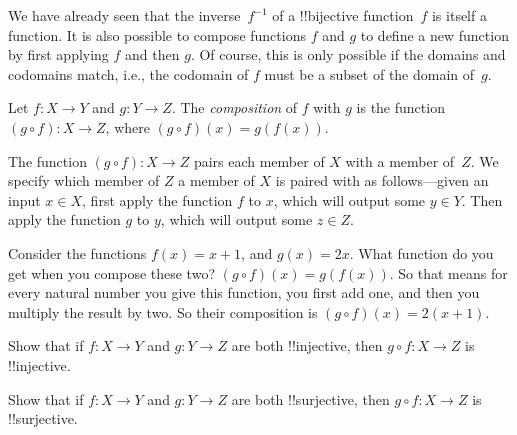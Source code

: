 \documentclass[../../../include/open-logic-section]{subfiles}
\begin{document}

\begin{explain}
We have already seen that the inverse~$f^{-1}$ of a !!{bijective}
function~$f$ is itself a function. It is also possible to compose
functions $f$ and $g$ to define a new function by first applying $f$
and then $g$. Of course, this is only possible if the domains and
codomains match, i.e., the codomain of $f$ must be a subset of the
domain of~$g$.
\end{explain}

\begin{defn}[Composition]
Let $f\colon X \to Y$ and $g\colon Y \to Z$. The \emph{composition} of
$f$ with $g$ is the function $(g \circ f) \colon X \rightarrow Z$,
where $(g \circ f)(x) = g(f(x))$.
\end{defn}

\begin{explain}
The function $(g \circ f) \colon X \rightarrow Z$ pairs each member of
$X$ with a member of~$Z$. We specify which member of $Z$ a member of
$X$ is paired with as follows---given an input $x \in X$, first apply
the function $f$ to $x$, which will output some $y \in Y$. Then apply
the function $g$ to $y$, which will output some $z \in Z$.
\end{explain}

\begin{ex}
Consider the functions $f(x) = x + 1$, and $g(x) = 2x$. What function
do you get when you compose these two? $(g \circ f)(x) = g(f(x))$. So
that means for every natural number you give this function, you first
add one, and then you multiply the result by two. So their composition
is $(g \circ f)(x) = 2(x+1)$.
\end{ex}

\begin{prob}
Show that if $f \colon X \to Y$ and $g \colon Y \to Z$ are both
!!{injective}, then $g \circ f \colon X \to Z$ is !!{injective}.
\end{prob}

\begin{prob}
Show that if $f \colon X \to Y$ and $g \colon Y \to Z$ are both
!!{surjective}, then $g \circ f \colon X \to Z$ is !!{surjective}.
\end{prob}
\end{document}
